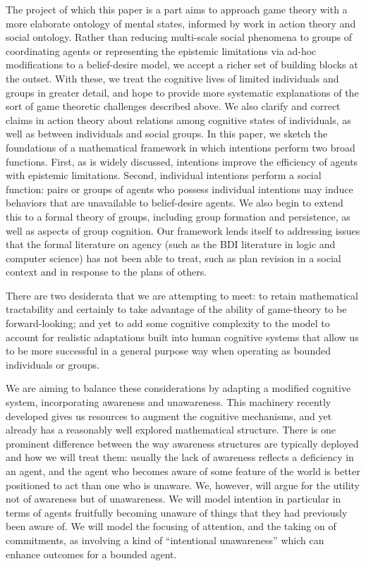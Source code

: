 \documentclass[
11pt,
titlepage,
reqno,
]{article}%
\theoremstyle{definition}
\begin{document}
The project of which this paper is a part aims to approach game theory with a more elaborate ontology of mental states, informed by work in action theory and social ontology. Rather than reducing multi-scale social phenomena to groups of coordinating agents or representing the epistemic limitations via ad-hoc modifications to a belief-desire model, we accept a richer set of building blocks at the outset. With these, we treat the cognitive lives of limited individuals and groups in greater detail, and hope to provide more systematic explanations of the sort of game theoretic challenges described above. We also clarify and correct claims in action theory about relations among cognitive states of individuals, as well as between individuals and social groups.
In this paper, we sketch the foundations of a mathematical framework in which intentions perform two broad functions. First, as is widely discussed, intentions improve the efficiency of agents with epistemic limitations. Second, individual intentions perform a social function: pairs or groups of agents who possess individual intentions may induce behaviors that are unavailable to belief-desire agents. We also begin to extend this to a formal theory of groups, including group formation and persistence, as well as aspects of group cognition. Our framework lends itself to addressing issues that the formal literature on agency (such as the BDI literature in logic and computer science) has not been able to treat, such as plan revision in a social context and in response to the plans of others.


	
There are two desiderata that we are attempting to meet: to retain mathematical tractability and certainly to take advantage of the ability of game-theory to be forward-looking; and yet to add some cognitive complexity to the model to account for realistic adaptations built into human cognitive systems that allow us to be more successful in a general purpose way when operating as bounded individuals or groups.
	
We are aiming to balance these considerations by adapting a modified cognitive system, incorporating awareness and unawareness. This machinery recently developed gives us resources to augment the cognitive mechanisms, and yet already has a reasonably well explored mathematical structure. There is one prominent difference between the way awareness structures are typically deployed and how we will treat them: usually the lack of awareness reflects a deficiency in an agent, and the agent who becomes aware of some feature of the world is better positioned to act than one who is unaware. We, however, will argue for the utility not of awareness but of unawareness. We will model intention in particular in terms of agents fruitfully becoming unaware of things that they had previously been aware of. We will model the focusing of attention, and the taking on of commitments, as involving a kind of ``intentional unawareness'' which can enhance outcomes for a bounded agent.
\end{document}
